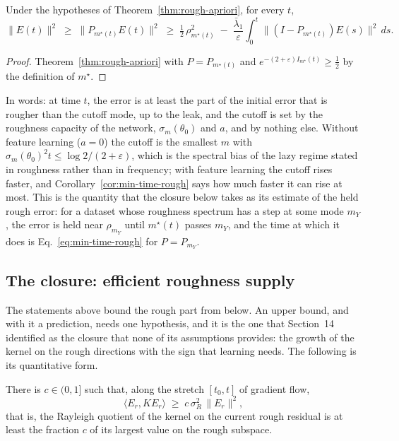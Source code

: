 \begin{proposition}
\label{prop:cutoff-floor}
Under the hypotheses of Theorem~\ref{thm:rough-apriori}, for every $t$,
\begin{equation}
\|E(t)\|^2 \;\ge\; \|P_{m^\star(t)}E(t)\|^2 \;\ge\; \tfrac12\,\rho_{m^\star(t)}^2 \;-\; \frac{\bar\lambda_1}{\varepsilon}\int_0^t\|(I-P_{m^\star(t)})E(s)\|^2\,ds .
\label{eq:cutoff-floor}
\end{equation}
\end{proposition}

\begin{proof}
Theorem~\ref{thm:rough-apriori} with $P=P_{m^\star(t)}$ and
$e^{-(2+\varepsilon)I_{m^\star}(t)}\ge\frac12$ by the definition of $m^\star$.
\end{proof}

In words: at time $t$, the error is at least the part of the initial error
that is rougher than the cutoff mode, up to the leak, and the cutoff is set
by the roughness capacity of the network, $\sigma_m(\theta_0)$ and $a$, and
by nothing else. Without feature learning ($a=0$) the cutoff is the smallest
$m$ with $\sigma_m(\theta_0)^2t\le\log2/(2+\varepsilon)$, which is the spectral
bias of the lazy regime stated in roughness rather than in frequency; with
feature learning the cutoff rises faster, and Corollary~\ref{cor:min-time-rough}
says how much faster it can rise at most. This is the quantity that the
closure below takes as its estimate of the held rough error: for a dataset
whose roughness spectrum has a step at some mode $m_Y$, the error is held near
$\rho_{m_Y}$ until $m^\star(t)$ passes $m_Y$, and the time at which it does is
Eq.~\eqref{eq:min-time-rough} for $P=P_{m_Y}$.

\subsection{The closure: efficient roughness supply}

The statements above bound the rough part from below. An upper bound, and
with it a prediction, needs one hypothesis, and it is the one that Section~14
identified as the closure that none of its assumptions provides: the growth of
the kernel on the rough directions with the sign that learning needs. The
following is its quantitative form.

\begin{assumption}
\label{ass:efficient}
There is $c\in(0,1]$ such that, along the stretch $[t_0,t]$ of gradient flow,
\begin{equation}
\langle E_r, K E_r\rangle \;\ge\; c\,\sigma_R^2\,\|E_r\|^2 ,
\label{eq:efficient}
\end{equation}
that is, the Rayleigh quotient of the kernel on the current rough residual is
at least the fraction $c$ of its largest value on the rough subspace.
\end{assumption}

